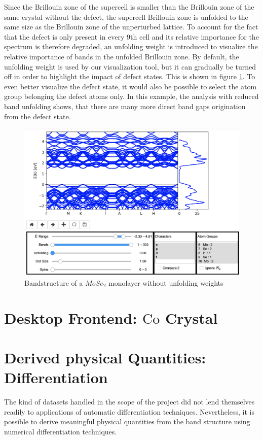 Since the Brillouin zone of the supercell is smaller than the Brillouin zone of the same crystal without the defect, the supercell Brillouin zone is unfolded to the same size as the Brillouin zone of the unperturbed lattice. To account for the fact that the defect is only present in every 9th cell and its relative importance for the spectrum is therefore degraded, an unfolding weight is introduced to visualize the relative importance of bands in the unfolded Brillouin zone. By default, the unfolding weight is used by our visualization tool, but it can gradually be turned off in order to highlight the impact of defect states. This is shown in figure \ref{example3}. To even better visualize the defect state, it would also be possible to select the atom group belonging the defect atoms only. In this example, the analysis with reduced band unfolding shows, that there are many more direct band gaps origination from the defect state.


\begin{figure}[htb!]
    \centering
    \includegraphics[width=0.7\linewidth]{christian/screen3.png}
    \caption{Bandstructure of a $MoSe_2$ monolayer without unfolding weights}
    \label{example3}
\end{figure}


\section{Desktop Frontend: $\textrm{Co}$ Crystal}



\section{Derived physical Quantities: Differentiation}
The kind of datasets handled in the scope of the project did not lend themselves
readily to applications of automatic differentiation techniques. Nevertheless,
it is possible to derive meaningful physical quantities from the band structure
using numerical differentiation techniques.

